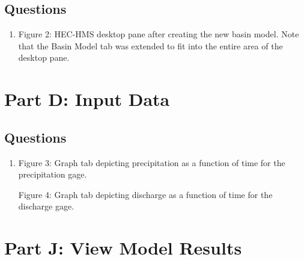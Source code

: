 \documentclass[]{article}
\begin{document}
\subsection{Questions}
\vspace{0.5 cm}
\begin{enumerate}[label=\textbf{\arabic*.}] 
	\item \begin{minipage}[t]{\linewidth}
		\raggedright
		
		\medskip
		\begin{center} 
			Figure 2: HEC-HMS desktop pane after creating the new basin model. Note that the Basin Model tab was extended to fit into the entire area of the desktop pane.
		\end{center}
	\end{minipage}
\end{enumerate} 
\newpage
\section{Part D: Input Data}
\subsection{Questions}
\vspace{0.5 cm}
\begin{enumerate}[label=\textbf{\arabic*.}] 
	\item \begin{minipage}[t]{\linewidth}
		\centering
		
		\medskip
		\begin{center} 
			Figure 3: Graph tab depicting precipitation as a function of time for the precipitation gage.
		\end{center}
		\bigskip
		\bigskip
		\centering
	\medskip
	\begin{center} 
		Figure 4: Graph tab depicting discharge as a function of time for the discharge gage.
	\end{center}
	\end{minipage}
\end{enumerate}
\newpage
\section{Part J: View Model Results}
\end{document}
